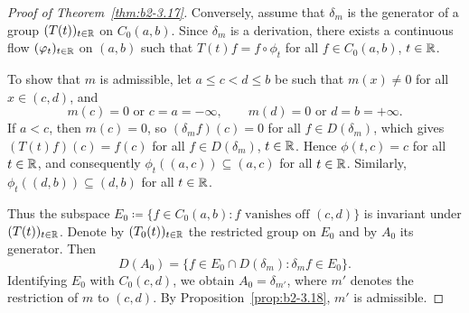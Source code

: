 \begin{proof}[Proof of Theorem~\ref{thm:b2-3.17}]
Conversely, assume that $\delta_{m}$ is the generator of a group $(T(t))_{t \in \mathbb{R}}$
on $C_{0}(a,b)$.
Since $\delta_{m}$ is a derivation, there exists a continuous flow $(\phi_{t})_{t \in \R}$
on $(a,b)$ such that $T(t)f = f \circ \phi_{t}$ for all $f \in C_{0}(a,b)$, $t \in \mathbb{R}$.

To show that $m$ is admissible, let $a \leq c < d \leq b$ be such that $m(x) \neq 0$
for all $x \in (c,d)$, and
\[
    m(c) = 0 \text{ or } c = a = -\infty,
    \qquad
    m(d) = 0 \text{ or } d = b = +\infty.
\]
If\/ $a < c$, then $m(c) = 0$, so $(\delta_{m}f)(c) = 0$ for all $f \in D(\delta_{m})$,
which gives $(T(t)f)(c) = f(c)$ for all $f \in D(\delta_{m})$, $t \in \mathbb{R}$.
Hence $\phi(t,c) = c$ for all $t \in \mathbb{R}$, and consequently
$\phi_{t}((a,c)) \subseteq (a,c)$ for all $t \in \mathbb{R}$.
Similarly, $\phi_{t}((d,b)) \subseteq (d,b)$ for all $t \in \mathbb{R}$.

Thus the subspace $E_{0} \coloneq \{f \in C_{0}(a,b) \colon f \text{ vanishes off } (c,d)\}$
is invariant under $(T(t))_{t \in \mathbb{R}}$.
Denote by $(T_{0}(t))_{t \in \mathbb{R}}$ the restricted group on $E_{0}$ and by $A_{0}$ its generator.
Then
\[
    D(A_{0}) = \{f \in E_{0} \cap D(\delta_{m}) \colon \delta_{m}f \in E_{0}\}.
\]
Identifying $E_{0}$ with $C_{0}(c,d)$, we obtain $A_{0} = \delta_{m'}$, where $m'$
denotes the restriction of\/ $m$ to $(c,d)$.
By Proposition~\ref{prop:b2-3.18}, $m'$ is admissible.
\end{proof}
